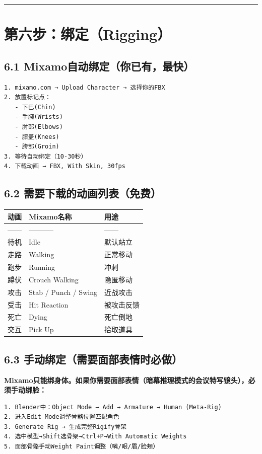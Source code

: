 \documentclass[12pt,a4paper,openany]{ctexbook}
\begin{document}
\bigskip\hrule\bigskip


\section*{第六步：绑定（Rigging）}


\subsection*{6.1 Mixamo自动绑定（你已有，最快）}


\begin{verbatim}
1. mixamo.com → Upload Character → 选择你的FBX
2. 放置标记点：
   - 下巴(Chin)
   - 手腕(Wrists)
   - 肘部(Elbows)
   - 膝盖(Knees)
   - 胯部(Groin)
3. 等待自动绑定（10-30秒）
4. 下载动画 → FBX, With Skin, 30fps
\end{verbatim}


\subsection*{6.2 需要下载的动画列表（免费）}


\begin{tabular}{|l|l|l|}
\hline
动画 & Mixamo名称 & 用途 \\
\hline
------ & ----------- & ------ \\
待机 & Idle & 默认站立 \\
走路 & Walking & 正常移动 \\
跑步 & Running & 冲刺 \\
蹲伏 & Crouch Walking & 隐匿移动 \\
攻击 & Stab / Punch / Swing & 近战攻击 \\
受击 & Hit Reaction & 被攻击反馈 \\
死亡 & Dying & 死亡倒地 \\
交互 & Pick Up & 拾取道具 \\
\hline
\end{tabular}


\subsection*{6.3 手动绑定（需要面部表情时必做）}


\textbf{Mixamo只能绑身体。如果你需要面部表情（暗幕推理模式的会议特写镜头），必须手动绑脸：}


\begin{verbatim}
1. Blender中：Object Mode → Add → Armature → Human (Meta-Rig)
2. 进入Edit Mode调整骨骼位置匹配角色
3. Generate Rig → 生成完整Rigify骨架
4. 选中模型→Shift选骨架→Ctrl+P→With Automatic Weights
5. 面部骨骼手动Weight Paint调整（嘴/眼/眉/脸颊）
\end{verbatim}
\end{document}
